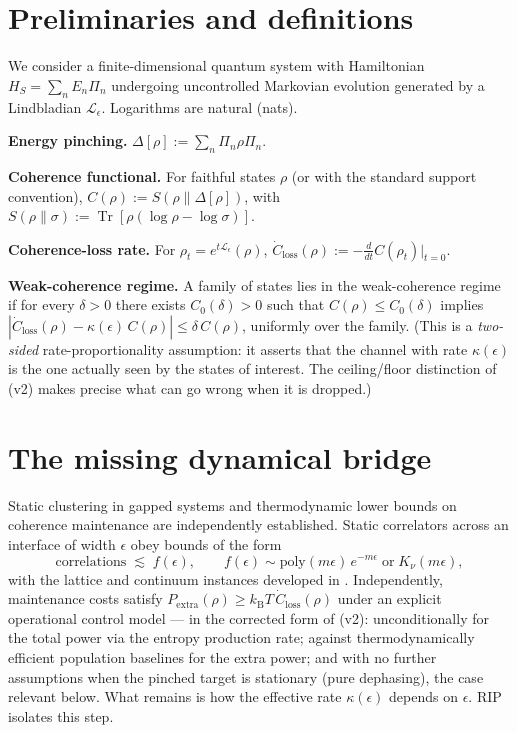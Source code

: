 \documentclass[11pt,a4paper]{article}
\theoremstyle{plain}
\theoremstyle{definition}
\theoremstyle{remark}
\newcommand{\Tr}{\operatorname{Tr}}
\newcommand{\kB}{k_{\mathrm{B}}}
\newcommand{\eps}{\epsilon}
\begin{document}
\section{Preliminaries and definitions}

We consider a finite-dimensional quantum system with Hamiltonian
$H_S = \sum_n E_n \Pi_n$ undergoing uncontrolled Markovian evolution generated
by a Lindbladian $\mathcal{L}_\eps$. Logarithms are natural (nats).

\textbf{Energy pinching.} $\Delta[\rho] := \sum_n \Pi_n \rho \Pi_n$.

\textbf{Coherence functional.} For faithful states $\rho$ (or with the
standard support convention),
$C(\rho) := S(\rho\|\Delta[\rho])$, with
$S(\rho\|\sigma) := \Tr[\rho(\log\rho - \log\sigma)]$.

\textbf{Coherence-loss rate.} For $\rho_t = e^{t\mathcal{L}_\eps}(\rho)$,
$\dot{C}_{\mathrm{loss}}(\rho) := -\frac{d}{dt}C(\rho_t)\big|_{t=0}$.

\textbf{Weak-coherence regime.} A family of states lies in the weak-coherence
regime if for every $\delta > 0$ there exists $C_0(\delta) > 0$ such that
$C(\rho) \le C_0(\delta)$ implies
$|\dot{C}_{\mathrm{loss}}(\rho) - \kappa(\eps)\,C(\rho)| \le \delta\,C(\rho)$,
uniformly over the family. (This is a \emph{two-sided} rate-proportionality
assumption: it asserts that the channel with rate $\kappa(\eps)$ is the one
actually seen by the states of interest. The ceiling/floor distinction of
\cite{Stress} (v2) makes precise what can go wrong when it is dropped.)

\section{The missing dynamical bridge}

Static clustering in gapped systems and thermodynamic lower bounds on
coherence maintenance are independently established. Static correlators
across an interface of width $\eps$ obey bounds of the form
\begin{equation}
\text{correlations} \;\lesssim\; f(\eps), \qquad
f(\eps) \sim \mathrm{poly}(m\eps)\, e^{-m\eps} \;\text{or}\; K_\nu(m\eps),
\end{equation}
with the lattice and continuum instances developed in \cite{Clustering}.
Independently, maintenance costs satisfy
$P_{\mathrm{extra}}(\rho) \ge \kB T\, \dot{C}_{\mathrm{loss}}(\rho)$ under an
explicit operational control model --- in the corrected form of
\cite{MaintWork} (v2): unconditionally for the total power via the entropy
production rate; against thermodynamically efficient population baselines for
the extra power; and with no further assumptions when the pinched target is
stationary (pure dephasing), the case relevant below. What remains is how the
effective rate $\kappa(\eps)$ depends on $\eps$. RIP isolates this step.
\end{document}
